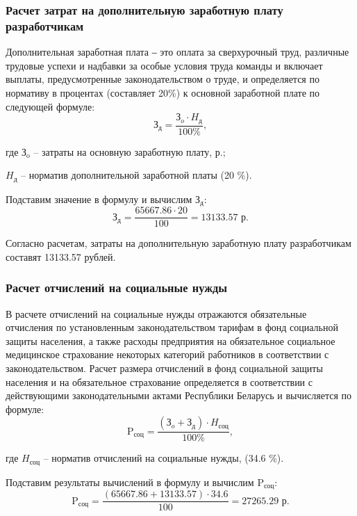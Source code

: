 \subsubsection{Расчет затрат на дополнительную заработную плату разработчикам}

Дополнительная заработная плата ‒ это оплата за сверхурочный труд, различные трудовые успехи и надбавки за особые условия труда команды и включает выплаты, предусмотренные законодательством о труде, и определяется по нормативу в процентах (составляет 20\%) к основной заработной плате по следующей формуле:
\begin{equation}
    \text{З}_{\text{д}} = \frac{\text{З}_{o}\cdot H_\text{д}}{100\%},
\end{equation}

где $\text{З}_{\text{o}}$ -- затраты на основную заработную плату, р.;

    $H_\text{д}$ -- норматив дополнительной заработной платы (20 \%).

Подставим значение в формулу и вычислим $\text{З}_{\text{д}}$:
$$
\text{З}_{\text{д}} = \frac{65667.86 \cdot 20}{100} = 13133.57 \text{ р}.
$$

Согласно расчетам, затраты на дополнительную заработную плату разработчикам составят 13133.57 рублей.

\subsubsection{Расчет отчислений на социальные нужды}

В расчете отчислений на социальные нужды отражаются обязательные отчисления по установленным законодательством тарифам в фонд социальной защиты населения, а также расходы предприятия на обязательное социальное медицинское страхование некоторых категорий работников в соответствии с законодательством. Расчет размера отчислений в фонд социальной защиты населения и на обязательное страхование определяется в соответствии с действующими законодательными актами Республики Беларусь и вычисляется по формуле:
\begin{equation}
    \text{P}_{\text{соц}} = \frac{(\text{З}_{o} + \text{З}_{\text{д}})\cdot H_\text{соц}}{100\%},
\end{equation}

где $H_\text{соц}$ -- норматив отчислений на социальные нужды, (34.6 \%).

Подставим результаты вычислений в формулу и вычислим $\text{P}_{\text{соц}}$:
$$
 \text{P}_{\text{соц}} = \frac{(65667.86 + 13133.57)\cdot 34.6}{100} = 27265.29 \text{ р}.
$$

